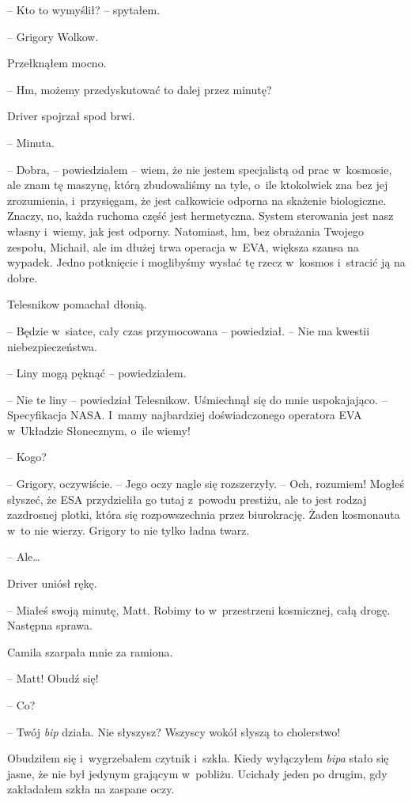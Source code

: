 \documentclass[oneside,polish,12pt,sfheadings]{mwbk}
\begin{document}
-- Kto to wymyślił? -- spytałem.

-- Grigory Wolkow.

Przełknąłem mocno.

-- Hm, możemy przedyskutować to dalej przez minutę?

Driver spojrzał spod brwi. 

-- Minuta.

-- Dobra, -- powiedziałem -- wiem, że nie jestem specjalistą od prac w~kosmosie, ale znam tę maszynę, którą zbudowaliśmy na tyle, o~ile
ktokolwiek zna bez jej zrozumienia, i~przysięgam, że jest całkowicie
odporna na skażenie biologiczne. Znaczy, no, każda ruchoma część jest
hermetyczna. System sterowania jest nasz własny i~wiemy, jak jest
odporny. Natomiast, hm, bez obrażania Twojego zespołu, Michaił, ale im
dłużej trwa operacja w~EVA, większa szansa na wypadek. Jedno potknięcie
i moglibyśmy wysłać tę rzecz w~kosmos i~stracić ją na dobre.

Telesnikow pomachał dłonią.

-- Będzie w~siatce, cały czas przymocowana -- powiedział. -- Nie ma kwestii
niebezpieczeństwa.

-- Liny mogą pęknąć -- powiedziałem.

-- Nie te liny -- powiedział Telesnikow. Uśmiechnął się do mnie
uspokajająco. -- Specyfikacja NASA. I~mamy najbardziej doświadczonego
operatora EVA w~Układzie Słonecznym, o~ile wiemy!

-- Kogo?

-- Grigory, oczywiście. -- Jego oczy nagle się rozszerzyły. -- Och,
rozumiem! Mogłeś słyszeć, że ESA przydzieliła go tutaj z~powodu
prestiżu, ale to jest rodzaj zazdrosnej plotki, która się rozpowszechnia
przez biurokrację. Żaden kosmonauta w~to nie wierzy. Grigory to nie
tylko ładna twarz.

-- Ale\ldots

Driver uniósł rękę. 

-- Miałeś swoją minutę, Matt. Robimy to w~przestrzeni
kosmicznej, całą drogę. Następna sprawa.

Camila szarpała mnie za ramiona.

-- Matt! Obudź się!

-- Co?

-- Twój \emph{bip} działa. Nie słyszysz? Wszyscy wokół słyszą to
cholerstwo!

Obudziłem się i~wygrzebałem czytnik i~szkła. Kiedy wyłączyłem
\emph{bipa} stało się jasne, że nie był jedynym grającym w~pobliżu.
Ucichały jeden po drugim, gdy zakładałem szkła na zaspane oczy.
\end{document}
